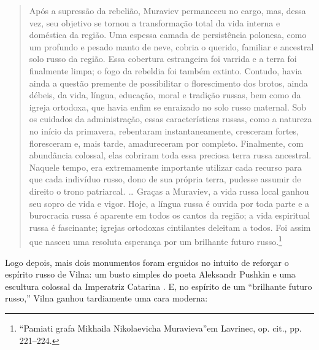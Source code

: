 \begin{quote}
Após a supressão da rebelião, Muraviev permaneceu no cargo, mas, dessa
vez, seu objetivo se tornou a transformação total da vida interna e
doméstica da região. Uma espessa camada de persistência polonesa, como
um profundo e pesado manto de neve, cobria o querido, familiar e
ancestral solo russo da região. Essa cobertura estrangeira foi varrida e
a terra foi finalmente limpa; o fogo da rebeldia foi também extinto.
Contudo, havia ainda a questão premente de possibilitar o florescimento
dos brotos, ainda débeis, da vida, língua, educação, moral e tradição
russas, bem como da igreja ortodoxa, que havia enfim se enraizado no
solo russo maternal. Sob os cuidados da administração, essas
características russas, como a natureza no início da primavera,
rebentaram instantaneamente, cresceram fortes, floresceram e, mais
tarde, amadureceram por completo. Finalmente, com abundância colossal,
elas cobriram toda essa preciosa terra russa ancestral. Naquele tempo,
era extremamente importante utilizar cada recurso para que cada
indivíduo russo, dono de sua própria terra, pudesse assumir de direito o
trono patriarcal. \ldots{} Graças a Muraviev, a vida russa local ganhou
seu sopro de vida e vigor. Hoje, a língua russa é ouvida por toda parte
e a burocracia russa é aparente em todos os cantos da região; a vida
espiritual russa é fascinante; igrejas ortodoxas cintilantes deleitam a
todos. Foi assim que nasceu uma resoluta esperança por um brilhante
futuro russo.\footnote{``Pamiati grafa Mikhaila Nikolaevicha Muravieva''em Lavrinec, op. cit., pp. 221--224.} 
\end{quote}

Logo depois, mais dois monumentos foram erguidos no intuito de reforçar
o espírito russo de Vilna: um busto simples do poeta Aleksandr Pushkin e
uma escultura colossal da Imperatriz Catarina . E, no espírito de um
``brilhante futuro russo,'' Vilna ganhou tardiamente uma cara moderna:


